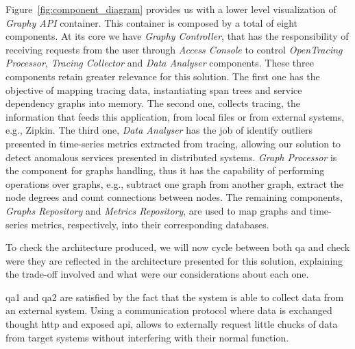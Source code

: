 Figure~\ref{fig:component_diagram} provides us with a lower level visualization of \emph{Graphy API} container. This container is composed by a total of eight components. At its core we have \emph{Graphy Controller}, that has the responsibility of receiving requests from the user through \emph{Access Console} to control \emph{OpenTracing Processor}, \emph{Tracing Collector} and \emph{Data Analyser} components. These three components retain greater relevance for this solution. The first one has the objective of mapping tracing data, instantiating span trees and service dependency graphs into memory. The second one, collects tracing, the information that feeds this application, from local files or from external systems, e.g., Zipkin. The third one, \emph{Data Analyser} has the job of identify outliers presented in time-series metrics extracted from tracing, allowing our solution to detect anomalous services presented in distributed systems. \emph{Graph Processor} is the component for graphs handling, thus it has the capability of performing operations over graphs, e.g., subtract one graph from another graph, extract the node degrees and count connections between nodes. The remaining components, \emph{Graphs Repository} and \emph{Metrics Repository}, are used to map graphs and time-series metrics, respectively, into their corresponding databases.

To check the architecture produced, we will now cycle between both \gls{qa} and check were they are reflected in the architecture presented for this solution, explaining the trade-off involved and what were our considerations about each one.

\gls{qa}1 and \gls{qa}2 are satisfied by the fact that the system is able to collect data from an external system. Using a communication protocol where data is exchanged thought \gls{http} and exposed \gls{api}, allows to externally request little chucks of data from target systems without interfering with their normal function.


